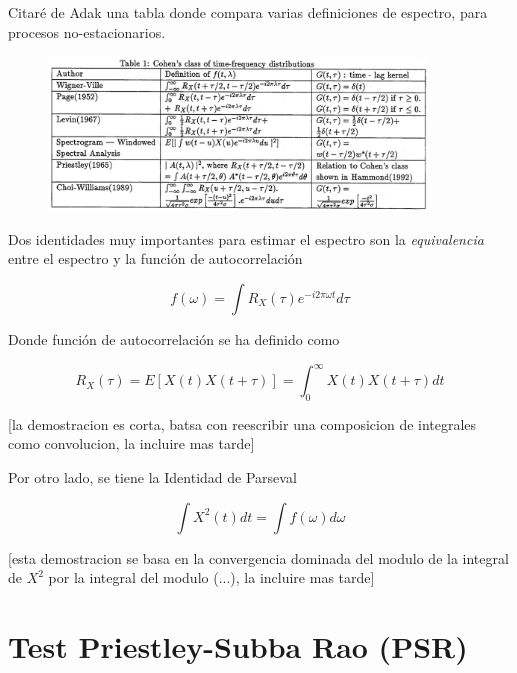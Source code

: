 Citar\'e de Adak \cite{Adak98} una tabla donde compara varias definiciones de espectro, para
procesos no-estacionarios.

\begin{figure}[h]
\centering
\includegraphics[width=0.9\textwidth]{tabla.png} 
\end{figure}

Dos identidades muy importantes para estimar el espectro son la \textit{equivalencia} entre
el espectro y la funci\'on de autocorrelaci\'on

\begin{equation*}
f(\omega ) = \int R_X(\tau ) e^{-i 2\pi \omega t} d\tau
\end{equation*}

Donde funci\'on de autocorrelaci\'on se ha definido como

\begin{equation*}
R_X(\tau) = E\left[ X(t) X(t+\tau) \right] = \int_0^{\infty} X(t)X(t+\tau) dt
\end{equation*}

[la demostracion es corta, batsa con reescribir una composicion de integrales como convolucion,
la incluire mas tarde]

Por otro lado, se tiene la Identidad de Parseval

\begin{equation*}
\int X^{2}(t) dt = \int f(\omega) d\omega
\end{equation*}

[esta demostracion se basa en la convergencia dominada del modulo de la integral de $X^{2}$ por
la integral del modulo (...), la incluire mas tarde]


\section{Test Priestley-Subba Rao (PSR)}

